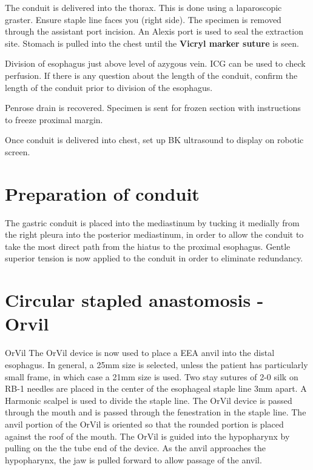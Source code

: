 \documentclass[
  letterpaper,
]{scrbook}
\begin{document}
The conduit is delivered into the thorax. This is done using a
laparoscopic graster. Ensure staple line faces you (right side). The
specimen is removed through the assistant port incision. An Alexis port
is used to seal the extraction site. Stomach is pulled into the chest
until the \textbf{Vicryl marker suture} is seen.

Division of esophagus just above level of azygous vein. ICG can be used
to check perfusion. If there is any question about the length of the
conduit, confirm the length of the conduit prior to division of the
esophagus.

Penrose drain is recovered. Specimen is sent for frozen section with
instructions to freeze proximal margin.

Once conduit is delivered into chest, set up BK ultrasound to display on
robotic screen.

\section{Preparation of conduit}\label{preparation-of-conduit-1}

The gastric conduit is placed into the mediastinum by tucking it
medially from the right pleura into the posterior mediastinum, in order
to allow the conduit to take the most direct path from the hiatus to the
proximal esophagus. Gentle superior tension is now applied to the
conduit in order to eliminate redundancy.

\section{Circular stapled anastomosis -
Orvil}\label{circular-stapled-anastomosis---orvil}

OrVil The OrVil device is now used to place a EEA anvil into the distal
esophagus. In general, a 25mm size is selected, unless the patient has
particularly small frame, in which case a 21mm size is used. Two stay
sutures of 2-0 silk on RB-1 needles are placed in the center of the
esophageal staple line 3mm apart. A Harmonic scalpel is used to divide
the staple line. The OrVil device is passed through the mouth and is
passed through the fenestration in the staple line. The anvil portion of
the OrVil is oriented so that the rounded portion is placed against the
roof of the mouth. The OrVil is guided into the hypopharynx by pulling
on the the tube end of the device. As the anvil approaches the
hypopharynx, the jaw is pulled forward to allow passage of the anvil.
\end{document}
